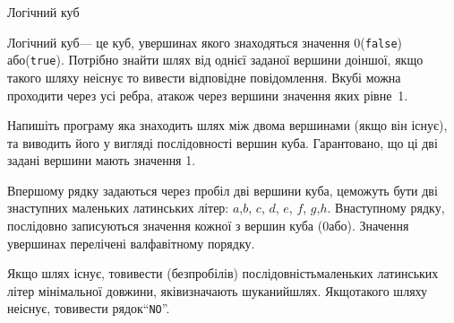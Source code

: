 \begin{problemAllDefault}{Логічний куб}

Логічний куб\nolinebreak[3] --- це куб, у\nolinebreak[3] вершинах якого знаходяться значення 0\nolinebreak[3] (\texttt{false}) або\nolinebreak[3] (\texttt{true}). Потрібно знайти шлях від однієї заданої вершини до\nolinebreak[2] іншої, якщо такого шляху не\nolinebreak[3] існує то вивести відповідне повідомлення. В\nolinebreak[3] кубі можна проходити через усі ребра, а\nolinebreak[3] також через вершини значення яких рівне~1.

Напишіть програму яка знаходить шлях між двома вершинами (якщо він існує), та виводить його у вигляді послідовності вершин куба. Гарантовано, що ці дві задані вершини мають значення 1.

\InputFile
В\nolinebreak[3] першому рядку задаються через пробіл дві вершини куба, це\nolinebreak[1] можуть бути дві з\nolinebreak[3] наступних маленьких латинських літер: $a$,\nolinebreak[3] $b$, $c$, $d$, $e$, $f$, $g$,\nolinebreak[3] $h$. В\nolinebreak[3] наступному рядку, послідовно записуються значення кожної з вершин куба (0\nolinebreak[2] або). Значення у\nolinebreak[2] вершинах перелічені в\nolinebreak[2] алфавітному порядку.

\OutputFile
Якщо шлях існує, то\nolinebreak[2] вивести (без\nolinebreak[2] пробілів) послідовність\linebreak[1] маленьких латинських літер мінімальної довжини, які\nolinebreak[2] визначають шуканий\nolinebreak[2] шлях. Якщо\nolinebreak[2] такого шляху не\nolinebreak[3] існує, то\nolinebreak[2] вивести рядок\nolinebreak[3] ``\texttt{NO}''.

\Examples
\begin{exampleSimple}{3em}{3em}%
%
%
\end{exampleSimple}

\end{problemAllDefault}

